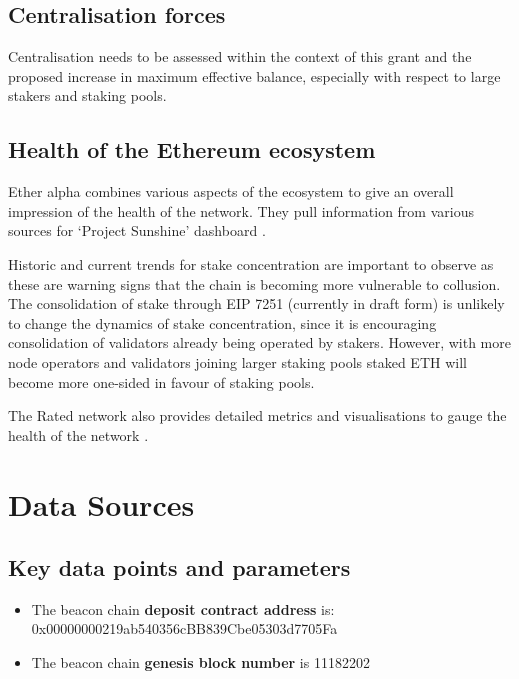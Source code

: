 \documentclass[UTF8]{article}
\begin{document}
{%
\subsection{Centralisation forces}
Centralisation needs to be assessed within the context of this grant and the proposed increase in maximum effective balance, especially with respect to large stakers and staking pools.


\subsection{Health of the Ethereum ecosystem}
Ether alpha combines various aspects of the ecosystem to give an overall impression of the health of the network. They pull information from various sources for `Project Sunshine' dashboard \cite{easunshine}. 

Historic and current trends for stake concentration are important to observe as these are warning signs that the chain is becoming more vulnerable to collusion. The consolidation of stake through EIP 7251 (currently in draft form) \cite{Neuder2023c} is unlikely to change the dynamics of stake concentration, since it is encouraging consolidation of validators already being operated by stakers. However, with more node operators and validators joining larger staking pools staked ETH will become more one-sided in favour of staking pools. 

The Rated network also provides detailed metrics and visualisations to gauge the health of the network \cite{Rated2023a}. 

\section{Data Sources}
\label{sec:sources}
\subsection{Key data points and parameters}
\begin{itemize}
\item The beacon chain \textbf{deposit contract address} is: 0x00000000219ab540356cBB839Cbe05303d7705Fa 
\item The beacon chain \textbf{genesis block number} is 11182202
\end{itemize}

}
\end{document}
